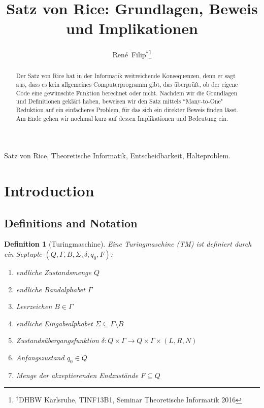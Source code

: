 \documentclass[journal]{IEEEtran}
\begin{document}
\newtheorem{definition}{Definition}
\newtheorem{theorem}{Satz}
\newtheorem{corollar}{Korollar}

\title{Satz von Rice: Grundlagen, Beweis und Implikationen}


\author{René~Filip$^{\dag}$\thanks{$^{\dag}$DHBW Karlsruhe, TINF13B1, Seminar Theoretische Informatik 2016}}


\maketitle


\begin{abstract}
Der Satz von Rice hat in der Informatik weitreichende Konsequenzen, denn er sagt aus, dass es kein allgemeines Computerprogramm gibt, das überprüft, ob der eigene Code eine gewünschte Funktion berechnet oder nicht. Nachdem wir die Grundlagen und Definitionen geklärt haben, beweisen wir den Satz mittels ``Many-to-One" Reduktion auf ein einfacheres Problem, für das sich ein direkter Beweis finden lässt. Am Ende gehen wir nochmal kurz auf dessen Implikationen und Bedeutung ein.
\end{abstract}


\begin{IEEEkeywords}
  Satz von Rice, Theoretische Informatik, Entscheidbarkeit, Halteproblem.
\end{IEEEkeywords}



\section{Introduction}



\subsection{Definitions and Notation}

\begin{definition}[Turingmaschine]
  Eine Turingmaschine (TM) ist definiert durch ein Septuple $(Q, \Gamma, B, \Sigma, \delta, q_0, F)$:
  \begin{enumerate}
    \item endliche Zustandsmenge $Q$
    \item endliche Bandalphabet $\Gamma$
    \item Leerzeichen $B \in \Gamma$
    \item endliche Eingabealphabet $\Sigma \subseteq \Gamma \setminus B$
    \item Zustandsübergangsfunktion $\delta \colon Q \times \Gamma \to Q \times \Gamma \times (L, R, N)$
    \item Anfangszustand $q_0 \in Q$
    \item Menge der akzeptierenden Endzustände $F \subseteq Q$
  \end{enumerate}
\end{definition}
\end{document}

